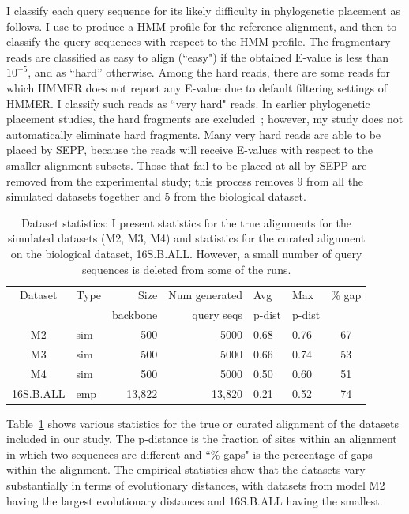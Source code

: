 I classify each query sequence
for its likely difficulty in phylogenetic placement as follows.
I use \hmmer to produce a
HMM profile for the reference alignment, and then to classify the 
query sequences with respect to the HMM profile.
The fragmentary reads are classified as easy to align (``easy") if the obtained
E-value is less than $10^{-5}$, and as ``hard'' otherwise.
Among the hard
reads, there are some reads for which HMMER does not report 
any E-value due to default filtering settings of HMMER. 
I classify such reads as ``very hard" reads.
In earlier phylogenetic placement studies, the hard fragments are
excluded~\cite{Matsen2010}; however,  my study does not 
automatically
eliminate hard fragments.
Many very hard reads are able to be placed by
SEPP, because the reads will receive
E-values with respect to the
smaller alignment subsets.  
Those that fail to be placed at all by SEPP are 
removed from the experimental study; this
process removes 9 from all the
simulated datasets together and 5 from the biological
dataset.

\begin{table}[htbp]
\begin{small} \centering
 \caption{Dataset statistics: 
I present statistics for the true alignments for
the simulated datasets (M2, M3, M4) and
statistics for the curated alignment
on the biological dataset, 16S.B.ALL.
However, a small number of query sequences is
deleted from some of the runs.
}
\begin{center}
\begin{tabular}{clrrllc}
\hline
\hline
Dataset & Type& Size & Num generated     	& Avg 		& Max&  \% gap\\
 	& 	&backbone & query seqs 	& p-dist 	& p-dist & \\\hline
M2 		& sim& 500 & 5000& 0.68 & 0.76 & 67\\\hline
M3 		& sim& 500 & 5000& 0.66 & 0.74 & 53\\\hline
M4 		& sim& 500 & 5000& 0.50 & 0.60 & 51\\\hline
16S.B.ALL 	& emp& 13,822& 13,820 & 0.21 & 0.52 & 74\\
\hline
\end{tabular}
\end{center}
 \label{tab:datasets}\end{small}
\end{table}

Table~\ref{tab:datasets} shows various statistics for the 
true or curated alignment of the datasets included in
our study. The p-distance is the
fraction of sites within an alignment in which two sequences are
different and ``\% gaps" is the percentage of gaps within the alignment.
The empirical statistics show that the datasets vary substantially
in terms of evolutionary distances, with datasets from
model M2 having the largest evolutionary 
distances and 16S.B.ALL having the smallest.

